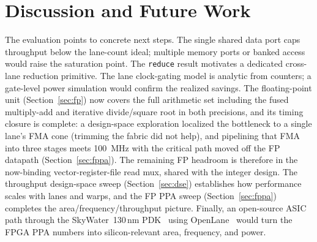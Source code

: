 \documentclass[conference]{IEEEtran}
\begin{document}
\section{Discussion and Future Work}\label{sec:future}
The evaluation points to concrete next steps. The single shared data port caps
throughput below the lane-count ideal; multiple memory ports or banked access
would raise the saturation point. The \texttt{reduce} result motivates a
dedicated cross-lane reduction primitive. The lane clock-gating model is
analytic from counters; a gate-level power simulation would confirm the realized
savings. The floating-point unit (Section~\ref{sec:fp}) now covers the full
arithmetic set including the fused multiply-add and iterative divide/square root
in both precisions, and its timing closure is complete: a design-space exploration
localized the bottleneck to a single lane's FMA cone (trimming the fabric did not
help), and pipelining that FMA into three stages meets 100~MHz with the critical
path moved off the FP datapath (Section~\ref{sec:fppa}). The remaining FP headroom
is therefore in the now-binding vector-register-file read mux, shared with the
integer design. The throughput design-space sweep (Section~\ref{sec:dse})
establishes how performance scales with lanes and warps, and the FP PPA sweep
(Section~\ref{sec:fppa}) completes the area/frequency/throughput picture. Finally, an open-source ASIC path through the
SkyWater~130\,nm PDK~\cite{sky130} using OpenLane~\cite{openlane} would turn the
FPGA PPA numbers into silicon-relevant area, frequency, and power.

\end{document}
